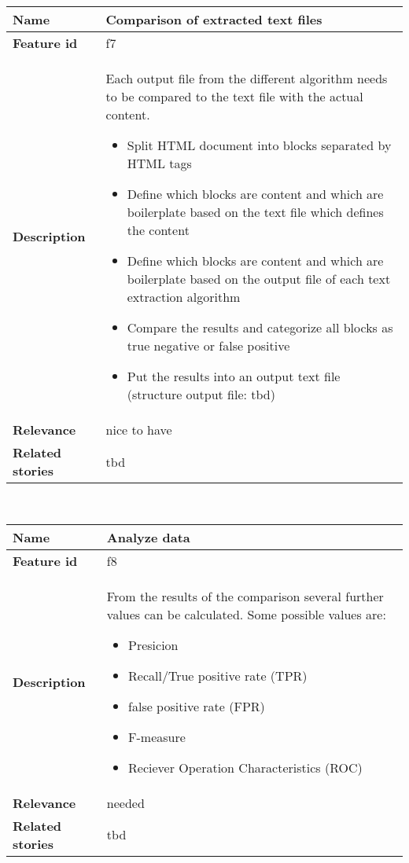 	\begin{tabular}{ | p{3cm} | p{12cm} |}
	\hline
	\textbf{Name} 				& Comparison of extracted text files \\ \hline
	\textbf{Feature id} 		& f7 \\ \hline
	\textbf{Description} 		& Each output file from the different algorithm needs to be compared to the text file with the actual content.
								\begin{itemize}
							        \item Split HTML document into blocks separated by HTML tags
							        \item Define which blocks are content and which are boilerplate based on the text file which defines the content
							        \item Define which blocks are content and which are boilerplate based on the output file of each text extraction algorithm
							        \item Compare the results and categorize all blocks as true negative or false positive
							        \item Put the results into an output text file (structure output file: tbd)
						        \end{itemize} \\ \hline
	\textbf{Relevance} 			& nice to have\\ \hline
	\textbf{Related stories} 	& tbd \\ \hline
	\end{tabular} \\


	\begin{tabular}{ | p{3cm} | p{12cm} |}
	\hline
	\textbf{Name} 				& Analyze data \\ \hline
	\textbf{Feature id} 		& f8 \\ \hline
	\textbf{Description} 		&  From the results of the comparison several further values can be calculated. Some possible values are:
									\begin{itemize}
									    \item Presicion
									    \item Recall/True positive rate (TPR)
									    \item false positive rate (FPR)
									    \item F-measure
									    \item Reciever Operation Characteristics (ROC)
								    \end{itemize} 
								    \\ \hline
	\textbf{Relevance} 			& needed \\ \hline
	\textbf{Related stories} 	& tbd \\ \hline
	\end{tabular} \\

